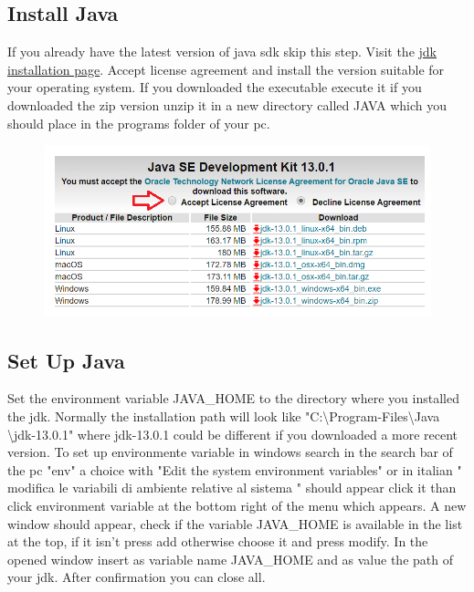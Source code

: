 \subsection{Install Java}
If you already have the latest version of java sdk skip this step.
Visit the \href{https://www.oracle.com/technetwork/java/javase/downloads/jdk13-downloads-5672538.html}{jdk installation page}.
Accept license agreement and install the version suitable for your operating system.
If you downloaded the executable execute it if you downloaded the zip version unzip it in a new directory called JAVA which you should place in the programs folder of your pc. 
\begin{figure}[h]
\centering
\includegraphics[width=\textwidth]{Images/javaVersionchoice.png}
\end{figure} 
\clearpage

\subsection{Set Up Java}

Set the environment variable JAVA\_HOME to the directory where you installed the jdk.
Normally the installation path will look like "C:\textbackslash Program-Files\textbackslash Java \textbackslash jdk-13.0.1" where jdk-13.0.1 could be different if you downloaded a more recent version. To set up environmente variable in windows search in the search bar of the pc "env" a choice with 
"Edit the system environment variables" or in italian " modifica le variabili di ambiente relative al sistema " should appear  
click it than click environment variable at the bottom right of the menu which appears. A new window should appear, check if the variable JAVA\_HOME is available in the list at the top, if it isn't  press add otherwise choose it and press modify. In the opened window insert as variable name JAVA\_HOME and as value the path of your jdk. After confirmation you can close all.

